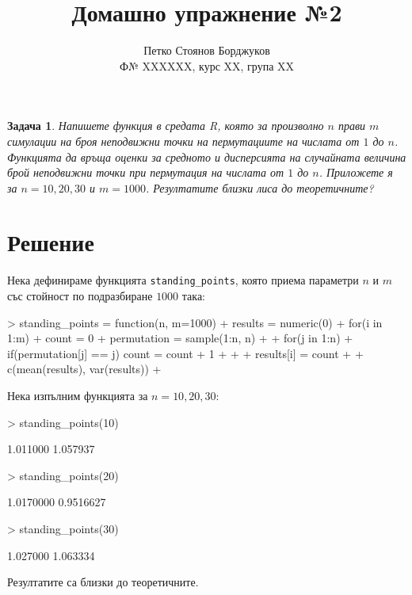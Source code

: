 \documentclass{report}
\newtheorem{pr}{Задача}
\newcommand\sol{\section*{Решение} }
\begin{document}
\title{Домашно упражнение №2}
\author{Петко Стоянов Борджуков\\\small{Ф№ XXXXXX, курс XX, група XX}}

\maketitle

\begin{pr}
  Напишете функция в средата R, която за произволно $n$ прави $m$ симулации на
  броя неподвижни точки на пермутациите на числата от $1$ до $n$. Функцията да
  връща оценки за средното и дисперсията на случайната величина брой неподвижни
  точки при пермутация на числата от $1$ до $n$. Приложете я за $n = 10, 20, 30$
  и $m = 1000$. Резултатите близки лиса до теоретичните?
\end{pr}

\sol
Нека дефинираме функцията \texttt{standing\_points}, която приема параметри $n$ и $m$ със стойност по подразбиране $1000$ така:
\begin{Schunk}
\begin{Sinput}
> standing_points = function(n, m=1000) {
+   results = numeric(0)
+   for(i in 1:m) {
+     count = 0
+     permutation = sample(1:n, n)
+ 
+     for(j in 1:n){
+       if(permutation[j] == j) count = count + 1
+     }
+ 
+     results[i] = count
+   }
+   c(mean(results), var(results))
+ }
\end{Sinput}
\end{Schunk}

Нека изпълним функцията за $n = 10, 20, 30$:
\begin{Schunk}
\begin{Sinput}
> standing_points(10)
\end{Sinput}
\begin{Soutput}
[1] 1.011000 1.057937
\end{Soutput}
\begin{Sinput}
> standing_points(20)
\end{Sinput}
\begin{Soutput}
[1] 1.0170000 0.9516627
\end{Soutput}
\begin{Sinput}
> standing_points(30)
\end{Sinput}
\begin{Soutput}
[1] 1.027000 1.063334
\end{Soutput}
\end{Schunk}

Резултатите са близки до теоретичните.
\end{document}
